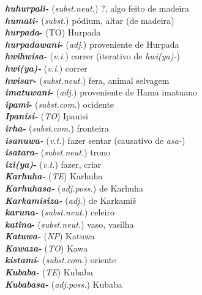 \begin{multicols}{2}
\begin{hangparas}{1em}{1}
		\textbf{\emph{huhurpali-}} (\emph{subst.neut.}) \tabto{1em} {?}, algo feito de madeira\\
		\textbf{\emph{humati-}} (\emph{subst.}) \tabto{1em} pódium, altar (de madeira)\\
		\textbf{\emph{hurpada}-} (TO) \tabto{1em} Hurpada\\
		\textbf{\emph{hurpadawani}-} (\emph{adj.}) \tabto{1em} proveniente de Hurpada\\
		\textbf{\emph{hwihwisa-}} (\emph{v.i.}) \tabto{1em} correr (iterativo de \emph{hwi{(ya)}-})\\
		\textbf{\emph{hwi{(ya)}-}} (\emph{v.i.}) \tabto{1em} correr\\
		\textbf{\emph{hwisar}-} (\emph{subst.neut.}) \tabto{1em} fera, animal selvagem\\
		\textbf{\emph{imatuwani}-} (\emph{adj.}) \tabto{1em} proveniente de Hama \tabto{1em} imatuano\\
		\textbf{\emph{ipami}-} (\emph{subst.com.}) \tabto{1em} ocidente\\
		\textbf{\emph{Ipanisi-}} (\emph{TO}) \tabto{1em} Ipanisi\\
		\textbf{\emph{irha-}} (\emph{subst.com.}) \tabto{1em} fronteira\\
		\textbf{\emph{isanuwa-}} (\emph{v.t.}) \tabto{1em} fazer sentar (causativo de \emph{asa-})\\
		\textbf{\emph{isatara-}} (\emph{subst.neut.}) \tabto{1em} trono\\
		\textbf{\emph{izi{(ya)}}-} (\emph{v.t.}) \tabto{1em} fazer, criar\\
		\textbf{\emph{Karhuha-}} (\emph{TE}) \tabto{1em} Karhuha\\
		\textbf{\emph{Karhuhasa-}} (\emph{adj.poss.}) \tabto{1em} de Karhuha\\
		\textbf{\emph{Karkamisiza-}} (\emph{adj.}) \tabto{1em} de Karkamiš\\
		\textbf{\emph{karuna-}} (\emph{subst.neut.}) \tabto{1em} celeiro\\
		\textbf{\emph{katina}-} (\emph{subst.neut.}) \tabto{1em} vaso, vasilha\\
		\textbf{\emph{Katuwa-}} (\emph{NP}) \tabto{1em} Katuwa\\
		\textbf{\emph{Kawaza-}} (\emph{TO}) \tabto{1em} Kawa\\
		\textbf{\emph{kistami}-} (\emph{subst.com.}) \tabto{1em} oriente\\
		\textbf{\emph{Kubaba-}} (\emph{TE}) \tabto{1em} Kubaba\\
		\textbf{\emph{Kubabasa-}} (\emph{adj.poss.}) \tabto{1em} Kubaba\\

\end{hangparas}
\end{multicols}
